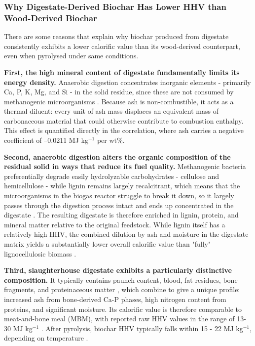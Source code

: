 \subsubsection*{Why Digestate-Derived Biochar Has Lower HHV than Wood-Derived Biochar}
There are some reasons that explain why biochar produced from digestate consistently exhibits a lower calorific value than its wood-derived counterpart, even when pyrolysed under same conditions.

\vspace{0.3em}

\textbf{First, the high mineral content of digestate fundamentally limits its energy density.}\newline
Anaerobic digestion concentrates inorganic elements - primarily Ca, P, K, Mg, and Si - in the solid residue, since these are not consumed by methanogenic microorganisms \cite{moller-2012,tambone-2010}. Because ash is non-combustible, it acts as a thermal diluent: every unit of ash mass displaces an equivalent mass of carbonaceous material that could otherwise contribute to combustion enthalpy. This effect is quantified directly in the \textcite{channiwala-2002} correlation, where ash carries a negative coefficient of –0.0211 MJ kg$^{-1}$ per wt\%.

\vspace{0.3em}

\textbf{Second, anaerobic digestion alters the organic composition of the residual solid in ways that reduce its fuel quality.} \newline
Methanogenic bacteria preferentially degrade easily hydrolyzable carbohydrates - cellulose and hemicellulose - while lignin remains largely recalcitrant, which means that the microorganisms in the biogas reactor struggle to break it down, so it largely passes through the digestion process intact and ends up concentrated in the digestate \cite{triolo-2011,monch-tegeder-2013}. The resulting digestate is therefore enriched in lignin, protein, and mineral matter relative to the original feedstock. While lignin itself has a relatively high HHV, the combined dilution by ash and moisture in the digestate matrix yields a substantially lower overall calorific value than "fully" lignocellulosic biomass \cite{pecchi-2019}.

\vspace{0.3em}

\textbf{Third, slaughterhouse digestate exhibits a particularly distinctive composition.} It typically contains paunch content, blood, fat residues, bone fragments, and proteinaceous matter \cite{salminen-2002,ware-2016}, which combine to give a unique profile: increased ash from bone-derived Ca-P phases, high nitrogen content from proteins, and significant moisture. Its calorific value is therefore comparable to meat-and-bone meal (MBM), with reported raw HHV values in the range of 13-30 MJ kg$^{-1}$ \cite{cascarosa-2011,conesa-2003,zaharioiu-2022}. After pyrolysis, biochar HHV typically falls within 15 - 22 MJ kg$^{-1}$, depending on temperature \cite{pecchi-2019,kujawska-2026}.

